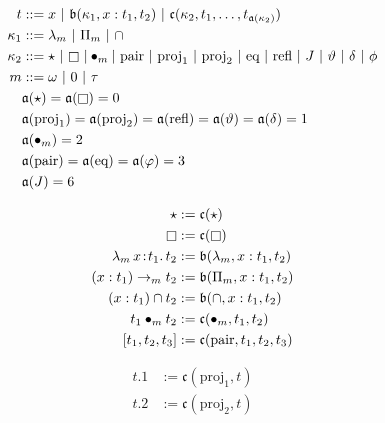 
\begin{figure}
    \centering
    \begin{align*}
        t &::= x\ |\ \mathfrak{b}(\kappa_1, x : t_1, t_2)\ |\ \mathfrak{c}(\kappa_2, t_1, \ldots, t_{\mathfrak{a}(\kappa_2)}) \\
        \kappa_1 &::= \lambda_m\ |\ \Pi_m\ |\ \cap \\
        \kappa_2 &::=\star\ |\ \kind\ | \bullet_m |\ \text{pair}\ |\ \text{proj}_1\ |\ \text{proj}_2\ |\ \text{eq}\ |\ \text{refl}\ |\ J\ |\ \vartheta\ |\ \delta\ |\ \phi  \\
        m &::= \omega\ |\ 0\ |\ \tau \\
        &\mathfrak{a}(\star) = \mathfrak{a}(\kind) = 0 \\
        &\mathfrak{a}(\text{proj}_1) = \mathfrak{a}(\text{proj}_2) = \mathfrak{a}(\text{refl}) = \mathfrak{a}(\vartheta) = \mathfrak{a}(\delta) = 1 \\
        &\mathfrak{a}(\bullet_m) = 2 \\
        &\mathfrak{a}(\text{pair}) = \mathfrak{a}(\text{eq}) = \mathfrak{a}(\varphi) = 3 \\
        &\mathfrak{a}(J) = 6
    \end{align*}
    \vspace{-.4in}
    \begin{minipage}{0.5\textwidth}
        \begin{align*}
            \star &:= \mathfrak{c}(\star) \\
            \kind &:= \mathfrak{c}(\kind) \\
            \abs{\lambda_m}{x}{t_1}{t_2} &:= \mathfrak{b}(\lambda_m, x : t_1, t_2) \\
            (x : t_1) \to_m t_2 &:= \mathfrak{b}(\Pi_m, x : t_1, t_2) \\
            (x : t_1) \cap t_2 &:= \mathfrak{b}(\cap, x : t_1, t_2) \\
            t_1 \bullet_m t_2 &:= \mathfrak{c}(\bullet_m, t_1, t_2) \\
            [t_1, t_2, t_3] &:= \mathfrak{c}(\text{pair}, t_1, t_2, t_3)
        \end{align*}
    \end{minipage}%
    \begin{minipage}{0.5\textwidth}
        \begin{align*}
            t.1 &:= \mathfrak{c}(\text{proj}_1, t) \\
            t.2 &:= \mathfrak{c}(\text{proj}_2, t) \\

\end{align*}
\end{minipage}
\end{figure}
